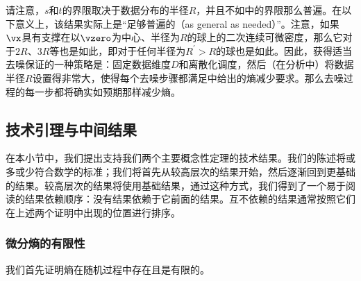 \documentclass[../../book-main_zh.tex]{subfiles}
\begin{document}
请注意，\(s\)和\(t\)的界限取决于数据分布的半径\(R\)，并且不如中的界限那么普遍。在以下意义上，该结果实际上是“足够普遍的（as general as needed）”。注意，如果\(\vx\)具有支撑在以\(\vzero\)为中心、半径为\(R\)的球上的二次连续可微密度，那么它对于\(2R\)、\(3R\)等也是如此，即对于任何半径为\(R^{\prime} > R\)的球也是如此。因此，获得适当去噪保证的一种策略是：固定数据维度\(D\)和离散化调度，然后（在分析中）将数据半径\(R\)设置得非常大，使得每个去噪步骤都满足中给出的熵减少要求。那么去噪过程的每一步都将确实如预期那样减少熵。

\subsection{技术引理与中间结果}\label{sub:app_diffusion_intermediate_results}

在本小节中，我们提出支持我们两个主要概念性定理的技术结果。我们的陈述将或多或少符合数学的标准；我们将首先从较高层次的结果开始，然后逐渐回到更基础的结果。较高层次的结果将使用基础结果，通过这种方式，我们得到了一个易于阅读的结果依赖顺序：没有结果依赖于它前面的结果。互不依赖的结果通常按照它们在上述两个证明中出现的位置进行排序。

\subsubsection{微分熵的有限性}

我们首先证明熵在随机过程中存在且是有限的。
\end{document}
